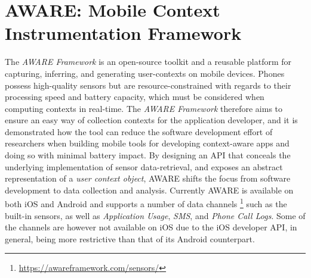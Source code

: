 \section{AWARE: Mobile Context Instrumentation Framework}
The \textit{AWARE Framework} \cite{aware2015} is an open-source toolkit and a reusable platform for capturing, inferring, and generating user-contexts on mobile devices. Phones possess high-quality sensors but are resource-constrained with regards to their processing speed and battery capacity, which must be considered when computing contexts in real-time. The \textit{AWARE Framework} therefore aims to ensure an easy way of collection contexts for the application developer, and it is demonstrated how the tool can reduce the software development effort of researchers when building mobile tools for developing context-aware apps and doing so with minimal battery impact. By designing an API that conceals the underlying implementation of sensor data-retrieval, and exposes an abstract representation of a \textit{user context object}, AWARE shifts the focus from software development to data collection and analysis. Currently AWARE is available on both iOS and Android and supports a number of data channels \footnote{\url{https://awareframework.com/sensors/}} such as the built-in sensors, as well as \textit{Application Usage}, \textit{SMS}, and \textit{Phone Call Logs}. Some of the channels are however not available on iOS due to the iOS developer API, in general, being more restrictive than that of its Android counterpart.